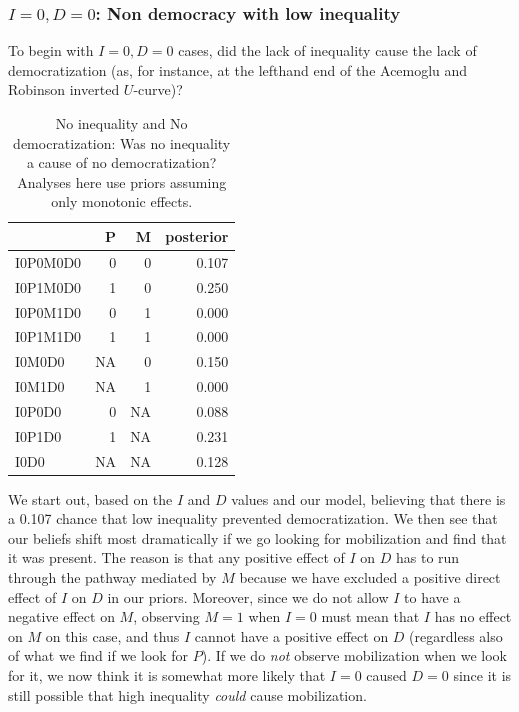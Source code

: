 \documentclass[12pt,]{book}
\begin{document}
\hypertarget{i0-d0-non-democracy-with-low-inequality}{%
\subsubsection{\texorpdfstring{\(I=0, D=0\): Non democracy with low inequality}{I=0, D=0: Non democracy with low inequality}}\label{i0-d0-non-democracy-with-low-inequality}}

To begin with \(I=0, D=0\) cases, did the lack of inequality cause the lack of democratization (as, for instance, at the lefthand end of the Acemoglu and Robinson inverted \(U\)-curve)?

\begin{table}[t]

\caption{\label{tab:Tapp1}No inequality and No democratization: Was no inequality a cause of no democratization? Analyses here use priors assuming only monotonic effects.}
\centering
\begin{tabular}{l|r|r|r}
\hline
  & P & M & posterior\\
\hline
I0P0M0D0 & 0 & 0 & 0.107\\
\hline
I0P1M0D0 & 1 & 0 & 0.250\\
\hline
I0P0M1D0 & 0 & 1 & 0.000\\
\hline
I0P1M1D0 & 1 & 1 & 0.000\\
\hline
I0M0D0 & NA & 0 & 0.150\\
\hline
I0M1D0 & NA & 1 & 0.000\\
\hline
I0P0D0 & 0 & NA & 0.088\\
\hline
I0P1D0 & 1 & NA & 0.231\\
\hline
I0D0 & NA & NA & 0.128\\
\hline
\end{tabular}
\end{table}

We start out, based on the \(I\) and \(D\) values and our model, believing that there is a 0.107 chance that low inequality prevented democratization. We then see that our beliefs shift most dramatically if we go looking for mobilization and find that it was present. The reason is that any positive effect of \(I\) on \(D\) has to run through the pathway mediated by \(M\) because we have excluded a positive direct effect of \(I\) on \(D\) in our priors. Moreover, since we do not allow \(I\) to have a negative effect on \(M\), observing \(M=1\) when \(I=0\) must mean that \(I\) has no effect on \(M\) on this case, and thus \(I\) cannot have a positive effect on \(D\) (regardless also of what we find if we look for \(P\)). If we do \emph{not} observe mobilization when we look for it, we now think it is somewhat more likely that \(I=0\) caused \(D=0\) since it is still possible that high inequality \emph{could} cause mobilization.
\end{document}
